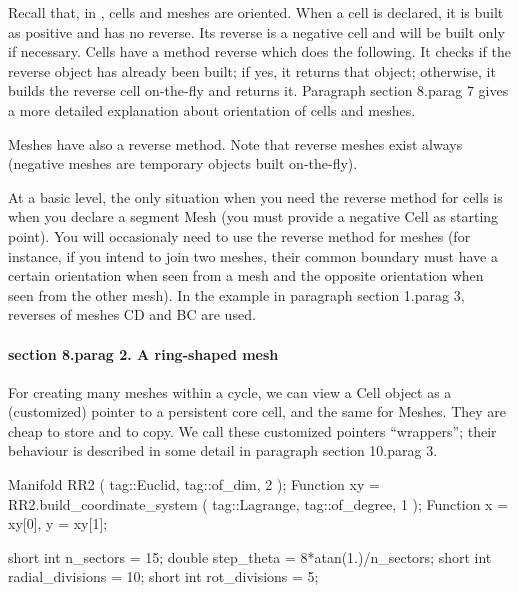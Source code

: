 Recall that, in \maniFEM, cells and meshes are oriented.
When a cell is declared, it is built as positive and has no reverse.
Its reverse is a negative cell and will be built only if necessary.
Cells have a method {\codett reverse} which does the following.
It checks if the reverse object has already been built; if yes, it returns that object;
otherwise, it builds the reverse cell on-the-fly and returns it.
Paragraph \numb section 8.\numb parag 7 gives a more detailed explanation about
orientation of cells and meshes.

{\codett Mesh}es have also a {\codett reverse} method.
Note that reverse meshes exist always (negative meshes are temporary objects built
on-the-fly).

At a basic level, the only situation when you need the {\codett reverse} method  for cells is
when you declare a segment {\codett Mesh} (you must provide a negative {\codett Cell} as
starting point).
You will occasionaly need to use the {\codett reverse} method for meshes (for instance, if you
intend to {\codett join} two meshes, their common boundary must have a certain orientation when
seen from a mesh and the opposite orientation when seen from the other mesh).
In the example in paragraph \numb section 1.\numb parag 3,
reverses of meshes {\codett CD} and {\codett BC} are used.


\vfil\eject

\paragraph{\numb section 8.\numb parag 2. A ring-shaped mesh}

For creating many meshes within a cycle, we can view a {\codett Cell} object as a
(customized) pointer to a persistent core cell, and the same for {\codett Mesh}es.
They are cheap to store and to copy.
We call these customized pointers ``wrappers''; their behaviour is described in some detail in
paragraph \numb section 10.\numb parag 3.

\verbatim
   Manifold RR2 ( tag::Euclid, tag::of_dim, 2 );
   Function xy = RR2.build_coordinate_system ( tag::Lagrange, tag::of_degree, 1 );
   Function x = xy[0],  y = xy[1];

   short int n_sectors = 15;
   double step_theta = 8*atan(1.)/n_sectors;
   short int radial_divisions = 10;
   short int rot_divisions = 5;
\endverbatim
   

